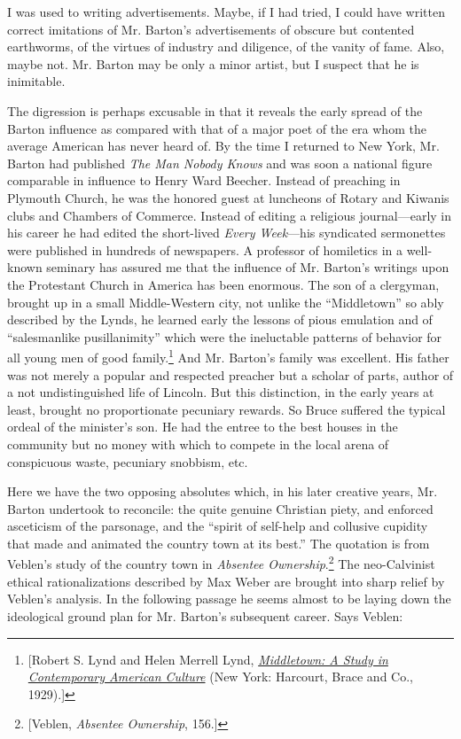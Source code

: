 \documentclass[openany,nobib]{tufte-book}
\begin{document}
I was used to writing advertisements. Maybe, if I had tried, I could
have written correct imitations of Mr. Barton's advertisements of
obscure but contented earthworms, of the virtues of industry and
diligence, of the vanity of fame. Also, maybe not. Mr. Barton may be
only a minor artist, but I suspect that he is inimitable.

The digression is perhaps excusable in that it reveals the early spread
of the Barton influence as compared with that of a major poet of the era
whom the average American has never heard of. By the time I returned to
New York, Mr. Barton had published \emph{The Man Nobody Knows} and was
soon a national figure comparable in influence to Henry Ward Beecher.
Instead of preaching in Plymouth Church, he was the honored guest at
luncheons of Rotary and Kiwanis clubs and Chambers of Commerce. Instead
of editing a religious journal---early in his career he had edited the
short-lived \emph{Every Week}---his syndicated sermonettes were
published in hundreds of newspapers. A professor of homiletics in a
well-known seminary has assured me that the influence of Mr. Barton's
writings upon the Protestant Church in America has been enormous. The
son of a clergyman, brought up in a small Middle-Western city, not
unlike the ``Middletown'' so ably described by the Lynds, he learned
early the lessons of pious emulation and of ``salesmanlike
pusillanimity'' which were the ineluctable patterns of behavior for all
young men of good family.\footnote{{[}Robert S. Lynd and Helen Merrell Lynd,
  \emph{\href{http://www.worldcat.org/oclc/1001579439}{Middletown: A
  Study in Contemporary American Culture}} (New York: Harcourt, Brace
  and Co., 1929).{]}} And Mr. Barton's family was excellent. His
father was not merely a popular and respected preacher but a scholar of
parts, author of a not undistinguished life of Lincoln. But this
distinction, in the early years at least, brought no proportionate
pecuniary rewards. So Bruce suffered the typical ordeal of the
minister's son. He had the entree to the best houses in the community
but no money with which to compete in the local arena of conspicuous
waste, pecuniary snobbism, etc.

Here we have the two opposing absolutes which, in his later creative
years, Mr. Barton undertook to reconcile: the quite genuine Christian
piety, and enforced asceticism of the parsonage, and the ``spirit of
self-help and collusive cupidity that made and animated the country town
at its best.'' The quotation is from Veblen's study of the country town
in \emph{Absentee Ownership}.\footnote{{[}Veblen, \emph{Absentee Ownership}, 156.{]}} The neo-Calvinist ethical
rationalizations described by Max Weber are brought into sharp relief by
Veblen's analysis. In the following passage he seems almost to be laying
down the ideological ground plan for Mr. Barton's subsequent career.
Says Veblen:
\end{document}
